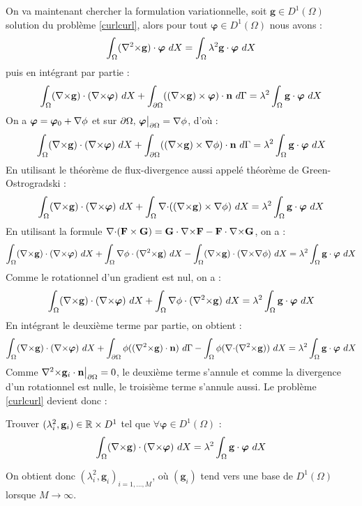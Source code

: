 On va maintenant chercher la formulation variationnelle, soit $\mathbf{g}\in D^1(\Omega)$ solution du problème \ref{curlcurl}, alors pour tout $\bm{\varphi}\in D^1(\Omega)$ nous avons :
\[ \int_\Omega ({\nabla^2\times} \mathbf{g})\cdot\bm{\varphi}\ dX = \int_\Omega\lambda^2 \mathbf{g}\cdot\bm{\varphi}\ dX \]
puis en intégrant par partie :
\[ \int_\Omega ({\nabla\times} \mathbf{g})\cdot({\nabla\times}\bm{\varphi})\ dX + \int_{\partial\Omega} (({\nabla\times} \mathbf{g})\times \bm{\varphi})\cdot \mathbf{n}\ d\Gamma = \lambda^2\int_\Omega \mathbf{g}\cdot\bm{\varphi}\ dX \]
On a $\bm{\varphi}=\bm{\varphi}_0+{\nabla}\phi$ et sur $\partial\Omega,\, \bm{\varphi}{\big\rvert_{\partial\Omega}}={\nabla}\phi$, d'où :
\[ \int_\Omega ({\nabla\times} \mathbf{g})\cdot({\nabla\times}\bm{\varphi})\ dX + \int_{\partial\Omega} (({\nabla\times} \mathbf{g})\times {\nabla}\phi)\cdot \mathbf{n}\ d\Gamma = \lambda^2\int_\Omega \mathbf{g}\cdot\bm{\varphi}\ dX \]
En utilisant le théorème de flux-divergence aussi appelé théorème de Green-Ostrogradski :
\[ \int_\Omega ({\nabla\times} \mathbf{g})\cdot({\nabla\times}\bm{\varphi})\ dX + \int_\Omega {\nabla\cdot}(({\nabla\times} \mathbf{g})\times {\nabla}\phi)\ dX = \lambda^2\int_\Omega \mathbf{g}\cdot\bm{\varphi}\ dX \]
En utilisant la formule ${\nabla\cdot}(\mathbf{F}\times \mathbf{G}) = \mathbf{G}\cdot {\nabla\times} \mathbf{F} - \mathbf{F}\cdot {\nabla\times} \mathbf{G}$, on a :
\[ \int_\Omega (\rot \mathbf{g})\cdot(\rot\bm{\varphi})\ dX + \int_\Omega \grad\phi\cdot(\rott \mathbf{g})\ dX -\int_\Omega (\rot \mathbf{g})\cdot (\rot\grad\phi)\ dX  = \lambda^2\int_\Omega \mathbf{g}\cdot\bm{\varphi}\ dX \]
Comme le rotationnel d'un gradient est nul, on a :
\[ \int_\Omega ({\nabla\times} \mathbf{g})\cdot({\nabla\times}\bm{\varphi})\ dX + \int_\Omega {\nabla}\phi\cdot({\nabla^2\times} \mathbf{g})\ dX  = \lambda^2\int_\Omega \mathbf{g}\cdot\bm{\varphi}\ dX \]
En intégrant le deuxième terme par partie, on obtient :
\[ \int_\Omega ({\nabla\times} \mathbf{g})\cdot({\nabla\times}\bm{\varphi})\ dX + \int_{\partial\Omega} \phi(({\nabla^2\times} \mathbf{g})\cdot \mathbf{n})\ d\Gamma - \int_\Omega \phi({\nabla\cdot}({\nabla^2\times} \mathbf{g}))\ dX  = \lambda^2\int_\Omega \mathbf{g}\cdot\bm{\varphi}\ dX \]
Comme ${\nabla^2\times}  \mathbf{g}_i\cdot \mathbf{n}{\big\rvert_{\partial\Omega}} = 0$, le deuxième terme s'annule et comme la divergence d'un rotationnel est nulle, le troisième terme s'annule aussi. Le problème \ref{curlcurl} devient donc :
\begin{pb}\label{fveigen}
Trouver $(\lambda_i^2,\mathbf{g}_i)\in {\mathbb{R}}\times D^1$ tel que $\forall \bm{\varphi}\in D^1(\Omega)$ :
\begin{equation*}
\int_\Omega ({\nabla\times} \mathbf{g})\cdot({\nabla\times}\bm{\varphi})\ dX = \lambda^2\int_\Omega \mathbf{g}\cdot\bm{\varphi}\ dX
\end{equation*}
\end{pb}
On obtient donc $(\lambda_i^2,\mathbf{g}_i)_{i=1,\dots,M}$, où $(\mathbf{g}_i)$ tend vers une base de $D^1(\Omega)$ lorsque $M\rightarrow \infty$.
